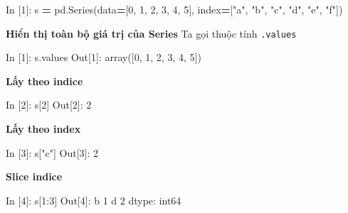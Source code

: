 \documentclass[
]{book}
\newenvironment{Shaded}{\begin{snugshade}}{\end{snugshade}}
\newcommand{\DecValTok}[1]{\textcolor[rgb]{0.00,0.00,0.81}{#1}}
\newcommand{\NormalTok}[1]{#1}
\newcommand{\OperatorTok}[1]{\textcolor[rgb]{0.81,0.36,0.00}{\textbf{#1}}}
\newcommand{\StringTok}[1]{\textcolor[rgb]{0.31,0.60,0.02}{#1}}
\begin{document}
\begin{Shaded}
\begin{Highlighting}[]
\NormalTok{In [}\DecValTok{1}\NormalTok{]: s }\OperatorTok{=}\NormalTok{ pd.Series(data}\OperatorTok{=}\NormalTok{[}\DecValTok{0}\NormalTok{, }\DecValTok{1}\NormalTok{, }\DecValTok{2}\NormalTok{, }\DecValTok{3}\NormalTok{, }\DecValTok{4}\NormalTok{, }\DecValTok{5}\NormalTok{], index}\OperatorTok{=}\NormalTok{[}\StringTok{"a"}\NormalTok{, }\StringTok{"b"}\NormalTok{, }\StringTok{"c"}\NormalTok{, }\StringTok{"d"}\NormalTok{, }\StringTok{"e"}\NormalTok{, }\StringTok{"f"}\NormalTok{])}
\end{Highlighting}
\end{Shaded}

\textbf{Hiển thị toàn bộ giá trị của Series}
Ta gọi thuộc tính \texttt{.values}

\begin{Shaded}
\begin{Highlighting}[]
\NormalTok{In [}\DecValTok{1}\NormalTok{]: s.values}
\NormalTok{Out[}\DecValTok{1}\NormalTok{]:}
\NormalTok{array([}\DecValTok{0}\NormalTok{, }\DecValTok{1}\NormalTok{, }\DecValTok{2}\NormalTok{, }\DecValTok{3}\NormalTok{, }\DecValTok{4}\NormalTok{, }\DecValTok{5}\NormalTok{])}
\end{Highlighting}
\end{Shaded}

\textbf{Lấy theo indice}

\begin{Shaded}
\begin{Highlighting}[]
\NormalTok{In [}\DecValTok{2}\NormalTok{]: s[}\DecValTok{2}\NormalTok{]}
\NormalTok{Out[}\DecValTok{2}\NormalTok{]: }\DecValTok{2}
\end{Highlighting}
\end{Shaded}

\textbf{Lấy theo index}

\begin{Shaded}
\begin{Highlighting}[]
\NormalTok{In [}\DecValTok{3}\NormalTok{]: s[}\StringTok{"c"}\NormalTok{]}
\NormalTok{Out[}\DecValTok{3}\NormalTok{]: }\DecValTok{2} 
\end{Highlighting}
\end{Shaded}

\textbf{Slice indice}

\begin{Shaded}
\begin{Highlighting}[]
\NormalTok{In [}\DecValTok{4}\NormalTok{]: s[}\DecValTok{1}\NormalTok{:}\DecValTok{3}\NormalTok{]}
\NormalTok{Out[}\DecValTok{4}\NormalTok{]:}
\NormalTok{b    }\DecValTok{1}
\NormalTok{d    }\DecValTok{2}
\NormalTok{dtype: int64}
\end{Highlighting}
\end{Shaded}
\end{document}
